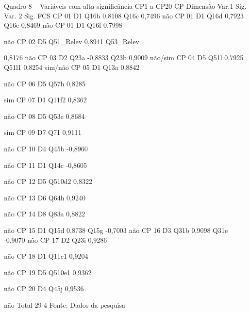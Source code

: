 Quadro 8 – Variáveis com alta significância CP1 a CP20
CP
Dimensão
Var.1
Sig.
Var. 2
Sig.
FCS
CP 01
D1
Q16b
0,8108
Q16c
0,7496
não
CP 01
D1
Q16d
0,7923
Q16e
0,8469
não
CP 01
D1
Q16f
0,7998


não
CP 02
D5
Q51_Relev
0,8941
Q53_Relev
 
0,8176
não
CP 03
D2
Q23a
-0,8833
Q23b
0,9009
não/sim
CP 04
D5
Q51l
0,7925
 Q51l1
0,8254
sim/não
CP 05
D1
Q13a
0,8842
 
 
não
CP 06
D5
Q57h
0,8285
 
 
sim
CP 07
D1
Q11f2
0,8362
 
 
não
CP 08
D5
Q53e
0,8684
 
 
sim
CP 09
D7
Q71
0,9111
 
 
não
CP 10
D4
Q45b
-0,8960

 
não
CP 11
D1
Q14c
-0,8605
 
 
não
CP 12
D5
Q510d2
0,8322
 
 
não
CP 13
D6
Q64h
0,9240
 
 
não
CP 14
D8
Q83a
0,8822
 
 
não
CP 15
D1
Q15d
0,8738
Q15g 
-0,7003 
não
CP 16
D3
Q31b
0,9098
Q31e 
-0,9070 
não
CP 17
D2
Q23i
0,9286
 
 
não
CP 18
D1
Q11c1
0,9204
 
 
não
CP 19
D5
Q510e1
0,9362
 
 
não
CP 20
D4
Q45j
0,9536
 
 
não
Total
29
4
Fonte: Dados da pesquisa

